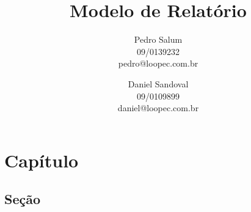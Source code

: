 \documentclass[12pt,a4paper]{report}
\title{Modelo de Relatório}
\author{Pedro Salum\\
	09/0139232\\
	pedro@loopec.com.br
	\and
	Daniel Sandoval\\
	09/0109899\\
	daniel@loopec.com.br}
\begin{document}
\maketitle
\tableofcontents

\chapter{Capítulo}

\section{Seção}



\end{document}
